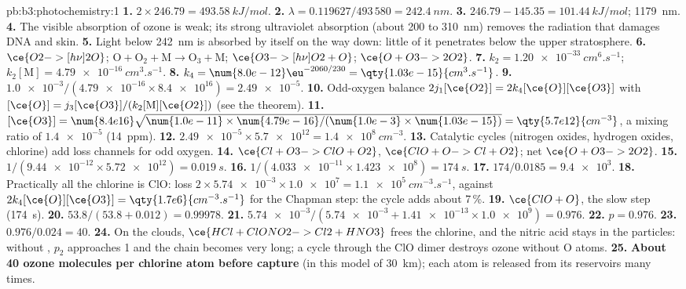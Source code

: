 \begin{solution}{pb:b3:photochemistry:1}
\textbf{1.} $2 \times 246.79 = \qty{493.58}{kJ/mol}$.
\textbf{2.} $\lambda = 0.119627/493\,580 = \qty{242.4}{nm}$.
\textbf{3.} $246.79 - 145.35 = \qty{101.44}{kJ/mol}$; \qty{1179}{nm}.
\textbf{4.} The visible absorption of ozone is weak; its strong ultraviolet absorption
(about 200 to \qty{310}{nm}) removes the radiation that damages DNA and skin.
\textbf{5.} Light below \qty{242}{nm} is absorbed by  itself on the way down: little of it
penetrates below the upper stratosphere.
\textbf{6.} $\ce{O2 ->[h\nu] 2 O}$; $\mathrm{O + O_2 + M \to O_3 + M}$; $\ce{O3 ->[h\nu] O2 + O}$; $\ce{O + O3 -> 2 O2}$.
\textbf{7.} $k_2 = \qty{1.20e-33}{cm^6.s^{-1}}$; $k_2[\mathrm M] = \qty{4.79e-16}{cm^3.s^{-1}}$.
\textbf{8.} $k_4 = \num{8.0e-12}\eu^{-2060/230} = \qty{1.03e-15}{cm^3.s^{-1}}$.
\textbf{9.} $\num{1.0e-3}/(\num{4.79e-16} \times \num{8.4e16}) = \num{2.49e-5}$.
\textbf{10.} Odd-oxygen balance $2j_1[\ce{O2}] = 2k_4[\ce{O}][\ce{O3}]$ with $[\ce{O}] = j_3[\ce{O3}]/(k_2[\mathrm M][\ce{O2}])$ (see the
theorem).
\textbf{11.} $[\ce{O3}] = \num{8.4e16}\sqrt{\num{1.0e-11} \times \num{4.79e-16}/(\num{1.0e-3} \times \num{1.03e-15})} =
\qty{5.7e12}{cm^{-3}}$, a mixing ratio of $\num{1.4e-5}$ (\qty{14}{ppm}).
\textbf{12.} $\num{2.49e-5} \times \num{5.7e12} = \qty{1.4e8}{cm^{-3}}$.
\textbf{13.} Catalytic cycles (nitrogen oxides, hydrogen oxides, chlorine) add loss
channels for odd oxygen.
\textbf{14.} $\ce{Cl + O3 -> ClO + O2}$, $\ce{ClO + O -> Cl + O2}$; net $\ce{O + O3 -> 2 O2}$.
\textbf{15.} $1/(\num{9.44e-12} \times \num{5.72e12}) = \qty{0.019}{s}$.
\textbf{16.} $1/(\num{4.033e-11} \times \num{1.423e8}) = \qty{174}{s}$.
\textbf{17.} $174/0.0185 = \num{9.4e3}$.
\textbf{18.} Practically all the chlorine is ClO: loss $2 \times \num{5.74e-3} \times \num{1.0e7} = \qty{1.1e5}{cm^{-3}.s^{-1}}$,
against $2k_4[\ce{O}][\ce{O3}] = \qty{1.7e6}{cm^{-3}.s^{-1}}$ for the Chapman step: the cycle adds
about 7\,\%.
\textbf{19.} $\ce{ClO + O}$, the slow step (\qty{174}{s}).
\textbf{20.} $53.8/(53.8 + 0.012) = 0.99978$.
\textbf{21.} $\num{5.74e-3}/(\num{5.74e-3} + \num{1.41e-13} \times \num{1.0e9}) = 0.976$.
\textbf{22.} $p = 0.976$.
\textbf{23.} $0.976/0.024 = 40$.
\textbf{24.} On the clouds, $\ce{HCl + ClONO2 -> Cl2 + HNO3}$ frees the chlorine, and the nitric acid
stays in the particles: without , $p_2$ approaches 1 and the chain becomes
very long; a cycle through the ClO dimer destroys ozone without O atoms.
\textbf{25.} \textbf{About 40 ozone molecules per chlorine atom before capture} (in this
model of \qty{30}{km}); each atom is released from its reservoirs many times.
\end{solution}
